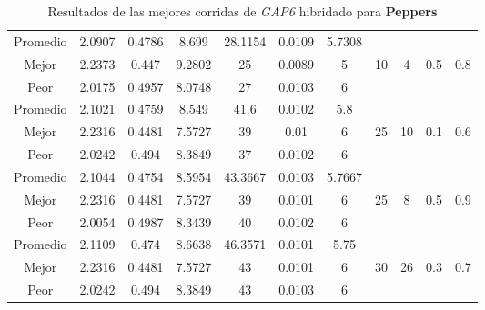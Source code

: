 \begin{table}[h!]
\begin{center}
\begin{tabular}{|c|c|c|c|c|c|c|c|c|c|c|}
        \hline
        \hline
            Promedio  & 2.0907 & 0.4786 & 8.699 & 28.1154 & 0.0109 & 5.7308 &  &  &  & \\
            \cline{1-7}
            Mejor & 2.2373 & 0.447  & 9.2802 & 25 & 0.0089 & 5 & 10 & 4 & 0.5 & 0.8\\
            \cline{1-7}
            Peor & 2.0175 & 0.4957  & 8.0748 & 27 & 0.0103 & 6 &  &  &  & \\
        \hline
        \hline
            Promedio  & 2.1021 & 0.4759 & 8.549 & 41.6 & 0.0102 & 5.8 &  &  &  & \\
            \cline{1-7}
            Mejor & 2.2316 & 0.4481  & 7.5727 & 39 & 0.01 & 6 & 25 & 10 & 0.1 & 0.6\\
            \cline{1-7}
            Peor & 2.0242 & 0.494  & 8.3849 & 37 & 0.0102 & 6 &  &  &  & \\
        \hline
        \hline
            Promedio  & 2.1044 & 0.4754 & 8.5954 & 43.3667 & 0.0103 & 5.7667 &  &  &  & \\
            \cline{1-7}
            Mejor & 2.2316 & 0.4481  & 7.5727 & 39 & 0.0101 & 6 & 25 & 8 & 0.5 & 0.9\\
            \cline{1-7}
            Peor & 2.0054 & 0.4987  & 8.3439 & 40 & 0.0102 & 6 &  &  &  & \\
        \hline
        \hline
            Promedio  & 2.1109 & 0.474 & 8.6638 & 46.3571 & 0.0101 & 5.75 &  &  &  & \\
            \cline{1-7}
            Mejor & 2.2316 & 0.4481  & 7.5727 & 43 & 0.0101 & 6 & 30 & 26 & 0.3 & 0.7\\
            \cline{1-7}
            Peor & 2.0242 & 0.494  & 8.3849 & 43 & 0.0103 & 6 &  &  &  & \\
        \hline
        \end{tabular}
        \caption{Resultados de las mejores corridas de \emph{GAP6} hibridado para {\bf Peppers}}
        \label{tb:tableGAP6}
    \end{center}
\end{table}
